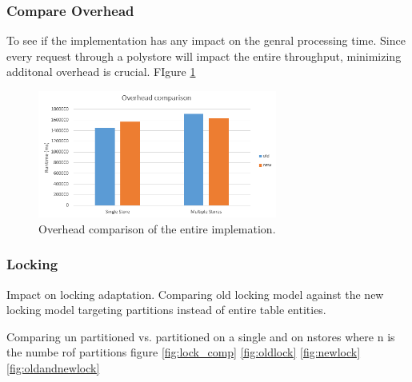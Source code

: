 \subsubsection{Compare Overhead} 
To see if the implementation has any impact on the genral processing time. 
Since every request through a polystore will impact the entire throughput, minimizing additonal overhead is crucial.
FIgure \ref{fig:overhead}
\begin{figure}[t] 
    \centering 
    \includegraphics[width=0.7\textwidth]{Figures/overhead.png}
    \caption{Overhead comparison of the entire implemation.}
    \label{fig:overhead}
\end{figure}


\subsubsection{Locking } 

Impact on locking adaptation. Comparing old locking model against the new locking model targeting partitions instead of entire table entities.

Comparing un partitioned vs. partitioned on a single and on nstores where n is the numbe rof partitions
figure \ref{fig:lock_comp} \ref{fig:oldlock} \ref{fig:newlock} \ref{fig:oldandnewlock}

